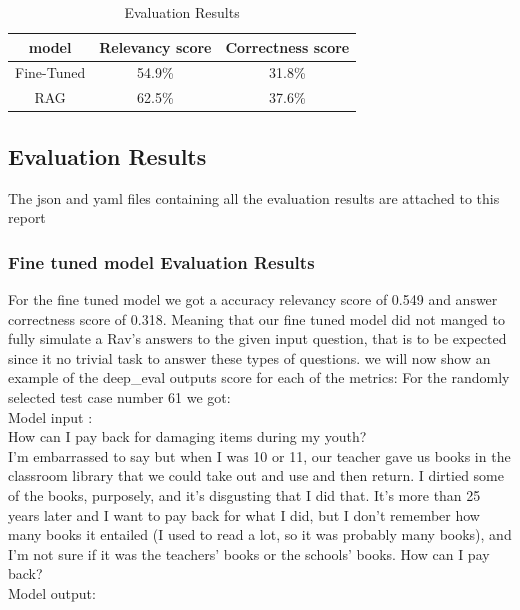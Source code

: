 \documentclass[11pt]{article}
\begin{document}
\begin{table}[htbp]
    \centering
    \caption{Evaluation Results}
    \label{tab:example}
    \begin{tabular}{ccc}
        \toprule
        model & Relevancy score & Correctness score   \\
        \midrule
        
        Fine-Tuned & 54.9\% & 31.8\%  \\
        RAG & 62.5\% & 37.6\% \\
        \bottomrule
    \end{tabular}
\end{table}

\subsection{Evaluation Results}
The json and yaml files containing all the evaluation results are attached to this report
\subsubsection{Fine tuned model Evaluation Results}
For the fine tuned model we got a accuracy relevancy score of 0.549 and answer correctness score of 0.318.
Meaning that our fine tuned model did not manged to fully simulate a Rav's answers to the given input question, that is to be expected since it no trivial task to answer these types of questions.
we will now show an example of the deep\_eval outputs score for each of the metrics:
For the randomly selected test case number 61 we got:\\
Model input :\\
How can I pay back for damaging items during my youth? \\
I’m embarrassed to say but when I was 10 or 11, our teacher gave us books in the classroom library that we could take out and use and then return. I dirtied some of the books, purposely, and it’s disgusting that I did that. It’s more than 25 years later and I want to pay back for what I did, but I don’t remember how many books it entailed (I used to read a lot, so it was probably many books), and I’m not sure if it was the teachers’ books or the schools’ books. How can I pay back?\\
Model output:\\
\end{document}
